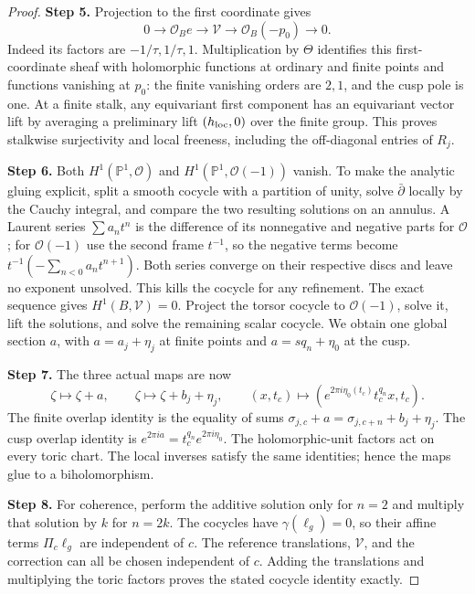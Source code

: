 \begin{proof}
\par\smallskip\noindent\textbf{Step 5.} Projection to the first coordinate gives
\[
 0\longrightarrow\mathcal O_Be\longrightarrow\mathcal V
 \longrightarrow\mathcal O_B(-p_0)\longrightarrow0.
\]
Indeed its factors are $-1/\tau,1/\tau,1$. Multiplication by $\Theta$ identifies this first-coordinate sheaf with holomorphic functions at ordinary and finite points and functions vanishing at $p_0$: the finite vanishing orders are $2,1$, and the cusp pole is one. At a finite stalk, any equivariant first component has an equivariant vector lift by averaging a preliminary lift $(h_{\rm loc},0)$ over the finite group. This proves stalkwise surjectivity and local freeness, including the off-diagonal entries of $R_j$.

\par\smallskip\noindent\textbf{Step 6.} Both $H^1(\mathbb P^1,\mathcal O)$ and $H^1(\mathbb P^1,\mathcal O(-1))$ vanish. To make the analytic gluing explicit, split a smooth cocycle with a partition of unity, solve $\bar\partial$ locally by the Cauchy integral, and compare the two resulting solutions on an annulus. A Laurent series $\sum a_nt^n$ is the difference of its nonnegative and negative parts for $\mathcal O$; for $\mathcal O(-1)$ use the second frame $t^{-1}$, so the negative terms become $t^{-1}(-\sum_{n<0}a_nt^{n+1})$. Both series converge on their respective discs and leave no exponent unsolved. This kills the cocycle for any refinement. The exact sequence gives $H^1(B,\mathcal V)=0$. Project the torsor cocycle to $\mathcal O(-1)$, solve it, lift the solutions, and solve the remaining scalar cocycle. We obtain one global section $a$, with $a=a_j+\eta_j$ at finite points and $a=sq_n+\eta_0$ at the cusp.

\par\smallskip\noindent\textbf{Step 7.} The three actual maps are now
\[
 \zeta\mapsto\zeta+a,\qquad
 \zeta\mapsto\zeta+b_j+\eta_j,\qquad
 (x,t_c)\mapsto(e^{2\pi i\eta_0(t_c)}t_c^{q_n}x,t_c).
\]
The finite overlap identity is the equality of sums
$\sigma_{j,c}+a=\sigma_{j,c+n}+b_j+\eta_j$. The cusp overlap identity is $e^{2\pi ia}=t_c^{q_n}e^{2\pi i\eta_0}$. The holomorphic-unit factors act on every toric chart. The local inverses satisfy the same identities; hence the maps glue to a biholomorphism.

\par\smallskip\noindent\textbf{Step 8.} For coherence, perform the additive solution only for $n=2$ and multiply that solution by $k$ for $n=2k$. The cocycles have $\gamma(\ell_g)=0$, so their affine terms $\Pi_c\ell_g$ are independent of $c$. The reference translations, $\mathcal V$, and the correction can all be chosen independent of $c$. Adding the translations and multiplying the toric factors proves the stated cocycle identity exactly.


\end{proof}
